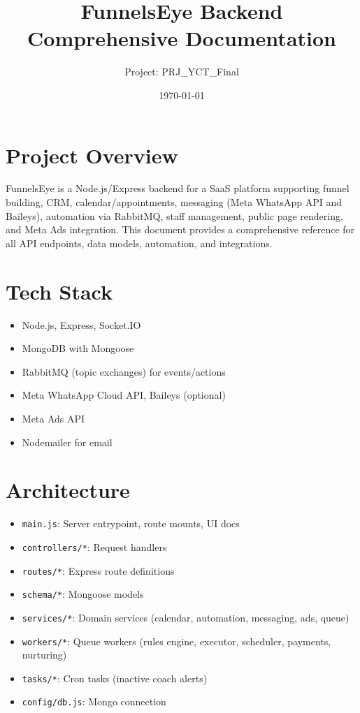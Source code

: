 \documentclass[11pt,a4paper]{article}
\title{FunnelsEye Backend Comprehensive Documentation}
\author{Project: PRJ\_YCT\_Final}
\date{\today}
\begin{document}
\maketitle
\tableofcontents

\section{Project Overview}
FunnelsEye is a Node.js/Express backend for a SaaS platform supporting funnel building, CRM, calendar/appointments, messaging (Meta WhatsApp API and Baileys), automation via RabbitMQ, staff management, public page rendering, and Meta Ads integration. This document provides a comprehensive reference for all API endpoints, data models, automation, and integrations.

\section{Tech Stack}
\begin{itemize}[noitemsep]
  \item Node.js, Express, Socket.IO
  \item MongoDB with Mongoose
  \item RabbitMQ (topic exchanges) for events/actions
  \item Meta WhatsApp Cloud API, Baileys (optional)
  \item Meta Ads API
  \item Nodemailer for email
\end{itemize}

\section{Architecture}
\begin{itemize}[noitemsep]
  \item \texttt{main.js}: Server entrypoint, route mounts, UI docs
  \item \texttt{controllers/*}: Request handlers
  \item \texttt{routes/*}: Express route definitions
  \item \texttt{schema/*}: Mongoose models
  \item \texttt{services/*}: Domain services (calendar, automation, messaging, ads, queue)
  \item \texttt{workers/*}: Queue workers (rules engine, executor, scheduler, payments, nurturing)
  \item \texttt{tasks/*}: Cron tasks (inactive coach alerts)
  \item \texttt{config/db.js}: Mongo connection
\end{itemize}
\end{document}
